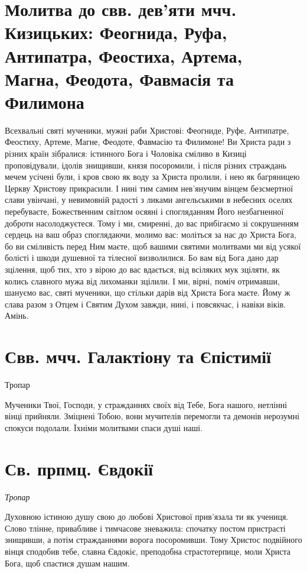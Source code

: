\documentclass[chapters.tex]{subfiles}
\begin{document}
\section{Молитва до свв. дев’яти мчч. Кизицьких: Феогнида, Руфа, Антипатра, Феостиха, Артема, Магна, Феодота, Фавмасія та Филимона}
Всехвальні святі мученики, мужні раби Христові: Феогниде, Руфе, Антипатре, Феостиху, Артеме, Магне, Феодоте, Фавмасію та Филимоне! Ви Христа ради з різних країн зібралися: істинного Бога і Чоловіка сміливо в Кизиці проповідували, ідолів знищивши, князя посоромили, і після різних страждань мечем усічені були, і кров свою як воду за Христа пролили, і нею як багряницею Церкву Христову прикрасили. І нині тим самим нев’янучим вінцем безсмертної слави увінчані, у невимовній радості з ликами ангельськими в небесних оселях перебуваєте, Божественним світлом осяяні і спогляданням Його незбагненної доброти насолоджуєтеся. Тому і ми, смиренні, до вас прибігаємо зі сокрушенням сердець на ваш образ споглядаючи, молимо вас: моліться за нас до Христа Бога, бо ви сміливість перед Ним маєте, щоб вашими святими молитвами ми від усякої болісті і шкоди душевної та тілесної визволилися. Бо вам від Бога дано дар зцілення, щоб тих, хто з вірою до вас вдається, від всіляких мук зціляти, як колись славного мужа від лихоманки зцілили. І ми, вірні, поміч отримавши, шануємо вас, святі мученики, що стільки дарів від Христа Бога маєте. Йому ж слава разом з Отцем і Святим Духом завжди, нині, і повсякчас, і навіки віків. Амінь.

\section{Свв. мчч. Галактіону та Єпістимії}
Тропар

Мученики Твої, Господи, у стражданнях своїх від Тебе, Бога нашого, нетлінні вінці прийняли. Зміцнені Тобою, вони мучителів перемогли та демонів нерозумні спокуси подолали. Їхніми молитвами спаси душі наші.

\section{Св. прпмц. Євдокії}
\emph{Тропар}

Духовною істиною душу свою до любові Христової прив’язала ти як учениця. Слово тлінне, привабливе і тимчасове зневажила: спочатку постом пристрасті знищивши, а потім стражданнями ворога посоромивши. Тому Христос подвійного вінця сподобив тебе, славна Євдокіє, преподобна страстотерпице, моли Христа Бога, щоб спастися душам нашим.
\end{document}
